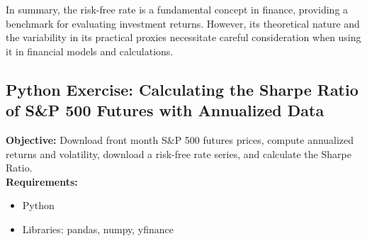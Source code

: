 \documentclass{article}
\begin{document}
In summary, the risk-free rate is a fundamental concept in finance, providing a benchmark for evaluating investment returns. However, its theoretical nature and the variability in its practical proxies necessitate careful consideration when using it in financial models and calculations.

\subsection{Python Exercise: Calculating the Sharpe Ratio of S\&P 500 Futures with Annualized Data}

\textbf{Objective:} Download front month S\&P 500 futures prices, compute annualized returns and volatility, download a risk-free rate series, and calculate the Sharpe Ratio. \\

\textbf{Requirements:}
\begin{itemize}
    \item Python
    \item Libraries: pandas, numpy, yfinance
\end{itemize}
\end{document}
